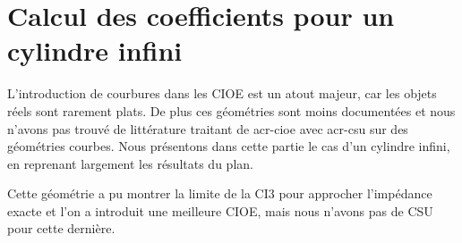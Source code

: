 \chapter{Calcul des coefficients pour un cylindre infini}
\label{sec:cylindre}
\minitoc
\newpage
{}
L'introduction de courbures dans les CIOE est un atout majeur, car les objets réels sont rarement plats. De plus ces géométries sont moins documentées et nous n'avons pas trouvé de littérature traitant de \gls{acr-cioe} avec \gls{acr-csu} sur des géométries courbes. Nous présentons dans cette partie le cas d'un cylindre infini, en reprenant largement les résultats du plan.







Cette géométrie a pu montrer la limite de la CI3 pour approcher l'impédance exacte et l’on a introduit une meilleure CIOE, mais nous n'avons pas de CSU pour cette dernière. 

